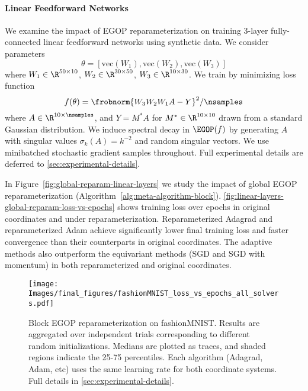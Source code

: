 \documentclass{article}
\begin{document}
\paragraph{Linear Feedforward Networks} We examine the impact of EGOP reparameterization on training 3-layer fully-connected linear feedforward networks using synthetic data. We consider parameters 
\[
    \theta = [\textrm{vec}(W_1), \textrm{vec}(W_2), \textrm{vec}(W_3)]
\]
where $W_1 \in \R^{50\times 10}$, $W_2 \in \R^{30\times 50}$, $W_3 \in \R^{10\times 30}$. We train by minimizing loss function
\begin{equation}\label{eq:linear-feedforward-objective}
    f(\theta) = \frobnorm{W_3 W_2 W_1 A - Y}^2 /\nsamples
\end{equation}
where $A\in \R^{10\times \nsamples}$, and $Y = M^* A$ for $M^*\in \R^{10\times 10}$ drawn from a standard Gaussian distribution. We induce spectral decay in $\EGOP(f)$ by generating $A$ with singular values $\sigma_k(A) = k^{-2}$ and random singular vectors. We use minibatched stochastic gradient samples throughout. Full experimental details are deferred to \cref{sec:experimental-details}. 

In Figure~\ref{fig:global-reparam-linear-layers} we study the impact of global EGOP reparameterization (Algorithm~\ref{alg:meta-algorithm-block}). \cref{fig:linear-layers-global-reparam-loss-vs-epochs} shows training loss over epochs in original coordinates and under reparameterization. Reparameterized Adagrad and reparameterized Adam achieve significantly lower final training loss and faster convergence than their counterparts in original coordinates. The adaptive methods also outperform the equivariant methods (SGD and SGD with momentum) in both reparameterized and original coordinates.

\begin{figure}
    \centering
    \texttt{[image: Images/final\_figures/fashionMNIST\_loss\_vs\_epochs\_all\_solvers.pdf]}
    \caption{Block EGOP reparameterization on fashionMNIST. Results are aggregated over independent trials corresponding to different random initializations. Medians are plotted as traces, and shaded regions indicate the 25-75 percentiles. Each algorithm (Adagrad, Adam, etc) uses the same learning rate for both coordinate systems. Full details in \cref{sec:experimental-details}.
    } \label{fig:fashionMNIST}
\end{figure}
\end{document}
